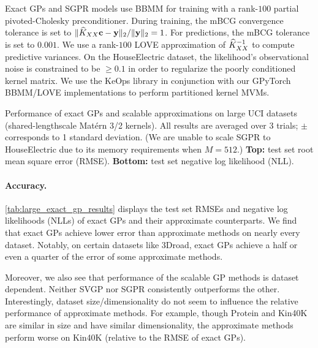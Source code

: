 Exact GPs and SGPR models use BBMM for training with a rank-$100$ partial pivoted-Cholesky preconditioner.
During training, the mBCG convergence tolerance is set to  $\Vert \widehat{K}_{XX} \mathbf{c} - \mathbf{y} \Vert_2 / \Vert \mathbf{y} \Vert_2 = 1$.
For predictions, the mBCG tolerance is set to $0.001$.
We use a rank-$100$ LOVE approximation of $\widehat{K}_{XX}^{-1}$ to compute predictive variances.
On the HouseElectric dataset, the likelihood's observational noise is constrained to be $\geq 0.1$ in order to regularize the poorly conditioned kernel matrix.
We use the KeOps library \cite{charlier2020kernel} in conjunction with our GPyTorch BBMM/LOVE implementations to perform partitioned kernel MVMs.

\begin{table}[!tb]
  \caption[Performance of exact GPs and scalable approximations on large UCI datasets.]{
    Performance of exact GPs and scalable approximations on large UCI datasets (shared-lengthscale Mat\'ern 3/2 kernels).
    All results are averaged over 3 trials; $\pm$ corresponds to 1 standard deviation.
    (We are unable to scale SGPR to HouseElectric due to its memory requirements when $M=512$.)
    {\bf Top:} test set root mean square error (RMSE).
    {\bf Bottom:} test set negative log likelihood (NLL).
  }
  \label{tab:large_exact_gp_results}
  \centering
  \vspace{1em}

  \resizebox{\textwidth}{!}{%
    
  }
  \vspace{1em}

  \resizebox{\textwidth}{!}{%
    
  }
  \vspace{1em}
\end{table}

\paragraph{Accuracy.}
\cref{tab:large_exact_gp_results} displays the test set RMSEs and negative log likelihoods (NLLs) of exact GPs and their approximate counterparts.
We find that exact GPs achieve lower error than approximate methods on nearly every dataset.
Notably, on certain datasets like 3Droad, exact GPs achieve a half or even a quarter of the error of some approximate methods.

Moreover, we also see that performance of the scalable GP methods is dataset dependent.
Neither SVGP nor SGPR consistently outperforms the other.
Interestingly, dataset size/dimensionality do not seem to influence the relative performance of approximate methods.
For example, though Protein and Kin40K are similar in size and have similar dimensionality, the approximate methods perform worse on Kin40K (relative to the RMSE of exact GPs).


